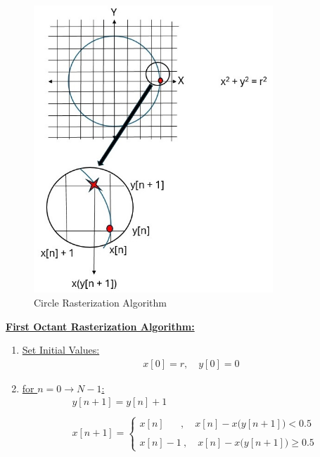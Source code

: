 \documentclass{article}
\begin{document}
\begin{figure}[ht!]
\centering
\includegraphics[width=90mm]{Circle Rasterization.jpg}
\caption{Circle Rasterization Algorithm \label{overflow}}
\end{figure}



\underline{\textbf{First Octant Rasterization Algorithm:}} \\
\begin{enumerate}
    \item \underline{Set Initial Values:} 
          \begin{align*}
                x[0] = r, \quad y[0] = 0 
            \end{align*}
    \item \underline{for $n = 0 \rightarrow N - 1$:} \\
          \begin{align*}
            &y[n + 1] = y[n] + 1 \\ \\
            &x[n + 1] = \begin{cases}
                            x[n] \quad \ \ \ , \quad x[n] - x\Big(y[n + 1]\Big) < 0.5 \\ \\
                            x[n] - 1 \ , \quad x[n] - x\Big(y[n + 1]\Big) \geq 0.5
                          \end{cases}
      \end{align*}
\end{enumerate}
\end{document}
